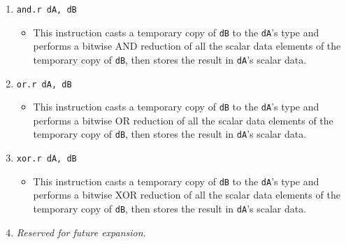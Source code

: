 \documentclass{article}
\begin{document}
\begin{itemize}
\begin{enumerate}
			\item \texttt{and.r dA, dB}
				\begin{itemize}
				\item This instruction casts a temporary copy of
					\texttt{dB} to the \texttt{dA}'s type and performs a
					bitwise AND reduction of all the scalar data elements
					of the temporary copy of \texttt{dB}, then stores the
					result in \texttt{dA}'s scalar data.
				\end{itemize}
			\item \texttt{or.r dA, dB}
				\begin{itemize}
				\item This instruction casts a temporary copy of
					\texttt{dB} to the \texttt{dA}'s type and performs a
					bitwise OR reduction of all the scalar data elements of
					the temporary copy of \texttt{dB}, then stores the
					result in \texttt{dA}'s scalar data.
				\end{itemize}
			\item \texttt{xor.r dA, dB}
				\begin{itemize}
				\item This instruction casts a temporary copy of
					\texttt{dB} to the \texttt{dA}'s type and performs a
					bitwise XOR reduction of all the scalar data elements
					of the temporary copy of \texttt{dB}, then stores the
					result in \texttt{dA}'s scalar data.
				\end{itemize}
			\item \textit{Reserved for future expansion.}
			\end{enumerate}
		\end{itemize}
		\newpage
\end{document}

